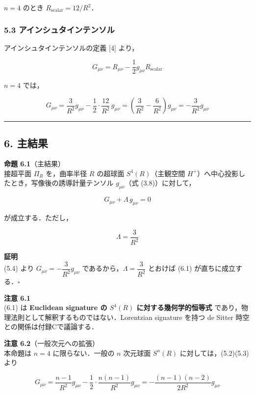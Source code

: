 \documentclass[a4paper,11pt]{ltjsarticle}
\theoremstyle{definition}
\begin{document}
\(n=4\) のとき \(R_{\text{scalar}} = 12/R^2\)．

\subsubsection{5.3 アインシュタインテンソル}\label{ux30a2ux30a4ux30f3ux30b7ux30e5ux30bfux30a4ux30f3ux30c6ux30f3ux30bdux30eb}

アインシュタインテンソルの定義 {[}4{]} より，

\[G_{\mu\nu} = R_{\mu\nu} - \frac{1}{2}g_{\mu\nu}R_{\text{scalar}} \tag{5.3}\]

\(n=4\) では，

\[G_{\mu\nu} = \frac{3}{R^2}g_{\mu\nu} - \frac{1}{2}\cdot\frac{12}{R^2}\,g_{\mu\nu} = \left(\frac{3}{R^2} - \frac{6}{R^2}\right)g_{\mu\nu} = -\frac{3}{R^2}g_{\mu\nu} \tag{5.4}\]

\begin{center}\rule{0.5\linewidth}{0.5pt}\end{center}

\subsection{6. 主結果}\label{ux4e3bux7d50ux679c}

\textbf{命題 6.1}（主結果）\\
接超平面 \(\Pi_R\) を，曲率半径 \(R\) の超球面 \(S^4(R)\)（主観空間 \(H^+\)）へ中心投影したとき，写像後の誘導計量テンソル \(g_{\mu\nu}\)（式 (3.8)）に対して，

\[G_{\mu\nu} + \Lambda\, g_{\mu\nu} = 0 \tag{6.1}\]

が成立する．ただし，

\[\boxed{\Lambda = \frac{3}{R^2}} \tag{6.2}\]

\textbf{証明}\\
(5.4) より \(G_{\mu\nu} = -\dfrac{3}{R^2}g_{\mu\nu}\) であるから，\(\Lambda = \dfrac{3}{R^2}\) とおけば (6.1) が直ちに成立する．\(\square\)

\textbf{注意 6.1}\\
(6.1) は \textbf{Euclidean signature の \(S^4(R)\) に対する幾何学的恒等式} であり，物理法則として解釈するものではない．Lorentzian signature を持つ de Sitter 時空との関係は付録Cで議論する．

\textbf{注意 6.2}（一般次元への拡張）\\
本命題は \(n=4\) に限らない．一般の \(n\) 次元球面 \(S^n(R)\) に対しては，(5.2)(5.3) より

\[G_{\mu\nu} = \frac{n-1}{R^2}g_{\mu\nu} - \frac{1}{2}\cdot\frac{n(n-1)}{R^2}g_{\mu\nu} = -\frac{(n-1)(n-2)}{2R^2}g_{\mu\nu}\]
\end{document}
